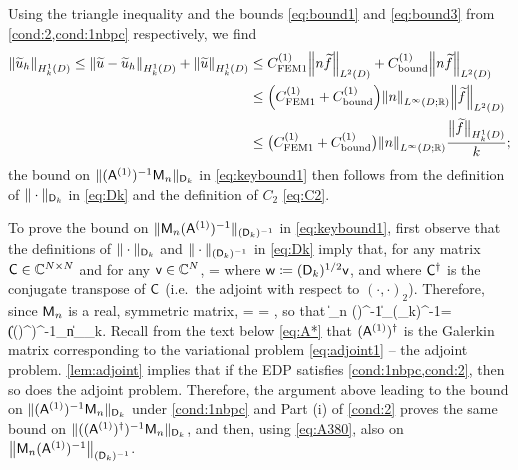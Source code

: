 Using %
the triangle inequality and the bounds \cref{eq:bound1} and \cref{eq:bound3} from \cref{cond:2,cond:1nbpc} respectively, we find
\begin{align}
\N{\tu_h}_{\HokD} \leq
\N{\tu-\tu_h}_{\HokD} + \N{\tu}_{\HokD} \label{eq:mainevent1}
& \leq C^{(1)}_{\rm FEM1}\NLtD{n\ftilde} + C^{(1)}_{\rm bound}\NLtD{n\ftilde} \\ 
& \leq \mleft(C^{(1)}_{\rm FEM1} + C^{(1)}_{\rm bound}\mright)\NLiDRR{n}\NLtD{\ftilde} \label{eq:mainevent1a} \\
& \leq\big(C^{(1)}_{\rm FEM1}+  C^{(1)}_{\rm bound}\big)\NLiDRR{n}\frac{\big\|\widetilde{f}\big\|_{\HokD}}{k};\nonumber
\end{align}
the bound on $\|(\mathsf{A}^{(1)})^{-1}\mathsf{M}_n\|_{\mathsf{D}_k}$ in \cref{eq:keybound1} then follows from the definition of $\|\cdot\|_{\mathsf{D}_k}$ in \cref{eq:Dk} and the definition of $C_2$ \cref{eq:C2}.

To prove the bound on $\|\mathsf{M}_n(\mathsf{A}^{(1)})^{-1}\|_{(\mathsf{D}_k)^{-1}}$ in \cref{eq:keybound1}, first observe that the definitions of $\|\cdot\|_{\mathsf{D}_k}$ and $\|\cdot\|_{(\mathsf{D}_k)^{-1}}$ in \cref{eq:Dk} imply that, for any matrix $\mathsf{C} \in \mathbb C^{N\times N}$ and for any $\mathsf{v}\in \mathbb C^N$,
\beq\label{eq:A380-0}
 = 
\eeq
where $\mathsf{w} \coloneqq (\mathsf{D}_k)^{1/2}\mathsf{v}$, and where $\mathsf{C}^\dagger$ is the conjugate transpose of $\mathsf{C}$ (i.e.~the adjoint with respect to $(\cdot,\cdot)_2$).
Therefore, since $\mathsf{M}_n$ is a real, symmetric matrix,
\beqs
{}
=
\frac{\NDk{\mleft(\AmatoI\Mmatn\mright)^\dagger \wvec}}{\NDk{\wvec}}
= 
,
 \eeqs
 so that 
\beq\label{eq:A380} 
 \big\|\Mmat_n (\Amato)^{-1}\big\|_{(\Dmat_k)^{-1}}=\big\|((\Amato)^\dagger)^{-1}\Mmat_n\big\|_{\Dmat_k}.
 \eeq 
Recall from the text below \cref{eq:A*} that $(\mathsf{A}^{(1)})^\dagger$ is the Galerkin matrix corresponding to the variational problem \cref{eq:adjoint1} -- the adjoint problem. \cref{lem:adjoint} implies that if the EDP %
satisfies \cref{cond:1nbpc,cond:2}, then so does the adjoint problem. Therefore, the argument above leading to the bound on $\|(\mathsf{A}^{(1)})^{-1}\mathsf{M}_n\|_{\mathsf{D}_k}$ under \cref{cond:1nbpc} and Part (i) of \cref{cond:2} proves the same bound on $\|((\mathsf{A}^{(1)})^\dagger)^{-1}\mathsf{M}_n\|_{\mathsf{D}_k}$, and then, using \cref{eq:A380}, also on $\big\|\mathsf{M}_n(\mathsf{A}^{(1)})^{-1}\big\|_{(\mathsf{D}_k)^{-1}}$.


